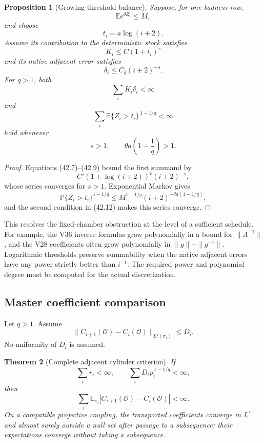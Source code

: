\documentclass[11pt]{article}
\newtheorem{theorem}{Theorem}[section]
\newtheorem{proposition}[theorem]{Proposition}
\begin{document}
\begin{proposition}[Growing-threshold balance]
\label{prop:v11v42-growing}
Suppose, for one badness row,
\[
 \mathbb E e^{\theta Z_i}\leq M,
 \tag{42.6}
\]
and choose
\[
 t_i=a\log(i+2).
 \tag{42.7}
\]
Assume its contribution to the deterministic stock satisfies
\[
 K_i\leq C(1+t_i)^r
 \tag{42.8}
\]
and its native adjacent error satisfies
\[
 \delta_i\leq C_\delta(i+2)^{-s}.
 \tag{42.9}
\]
For \(q>1\), both
\[
 \sum_iK_i\delta_i<\infty
 \tag{42.10}
\]
and
\[
 \sum_i
 \mathbb P\{Z_i>t_i\}^{\,1-1/q}<\infty
 \tag{42.11}
\]
hold whenever
\[
 s>1,\qquad
 \theta a\left(1-\frac1q\right)>1.
 \tag{42.12}
\]
\end{proposition}

\begin{proof}
Equations (42.7)--(42.9) bound the first summand by
\[
 C'(1+\log(i+2))^r(i+2)^{-s},
\]
whose series converges for \(s>1\).  Exponential Markov gives
\[
 \mathbb P\{Z_i>t_i\}^{1-1/q}
 \leq
 M^{1-1/q}
 (i+2)^{-\theta a(1-1/q)},
\]
and the second condition in (42.12) makes this series converge.
\end{proof}

This resolves the fixed-chamber obstruction at the level of a
sufficient schedule.  For example, the V36 inverse formulas grow
polynomially in a bound for \(\|A^{-1}\|\), and the V28 coefficients
often grow polynomially in \(\|g\|+\|g^{-1}\|\).  Logarithmic
thresholds preserve summability when the native adjacent errors have
any power strictly better than \(i^{-1}\).  The required power and
polynomial degree must be computed for the actual discretization.

\subsection{Master coefficient comparison}

Let \(q>1\).  Assume
\[
 \|C_{i+1}(\mathcal O)-C_i(\mathcal O)\|_{L^q(\pi_i)}
 \leq D_i.
 \tag{42.13}
\]
No uniformity of \(D_i\) is assumed.

\begin{theorem}[Complete adjacent cylinder criterion]
\label{thm:v11v42-master}
If
\[
 \sum_i r_i<\infty,
 \qquad
 \sum_iD_ip_i^{\,1-1/q}<\infty,
 \tag{42.14}
\]
then
\[
 \sum_i
 \mathbb E_{\pi_i}
 |C_{i+1}(\mathcal O)-C_i(\mathcal O)|
 <\infty.
 \tag{42.15}
\]
On a compatible projective coupling, the transported coefficients
converge in \(L^1\) and almost surely outside a null set after passage to
a subsequence; their expectations converge without taking a
subsequence.
\end{theorem}
\end{document}
